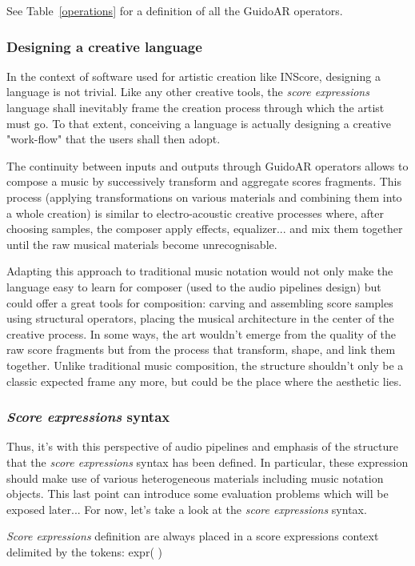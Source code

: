 \documentclass{article}
\newenvironment{INScode}		{\vspace{-2mm}\small\verbatim}{\endverbatim\vspace{-2mm}}
\newcommand{\sExpr}{\emph{score expressions} }
\newcommand{\SExpr}{\emph{Score expressions} }
\begin{document}
See Table~\ref{operations} for a definition of all the GuidoAR operators.

\subsubsection{Designing a creative language}
In the context of software used for artistic creation like INScore, designing a language is not trivial. Like any other creative tools,  the \sExpr language shall inevitably frame the creation process through which the artist must go. To that extent, conceiving a language is actually designing a creative "work-flow" that the users shall then adopt.

The continuity between inputs and outputs through GuidoAR operators allows to compose a music by successively transform and aggregate scores fragments. This process (applying transformations on various materials and combining them into a whole creation) is similar to electro-acoustic creative processes where, after choosing samples, the composer apply effects, equalizer... and mix them together until the raw musical materials become unrecognisable.

Adapting this approach to traditional music notation would not only make the language easy to learn for composer (used to the audio pipelines design) but could offer a great tools for composition: carving and assembling score samples using structural operators, placing the musical architecture in the center of the creative process. In some ways, the art wouldn't emerge from the quality of the raw score fragments but from the process that transform, shape, and link them together. Unlike traditional music composition, the structure shouldn't only be a classic expected frame any more, but could be the place where the aesthetic lies.

\subsubsection{\SExpr syntax}

Thus, it's with this perspective of audio pipelines and emphasis of the structure that the \sExpr syntax has been defined. In particular, these expression should make use of various heterogeneous materials including music notation objects. This last point can introduce some evaluation problems which will be exposed later... For now, let's take a look at the \sExpr syntax.

\smallbreak
\SExpr definition are always placed in a score expressions context delimited by the tokens:
\begin{INScode}
expr(      )
\end{INScode}
\end{document}
